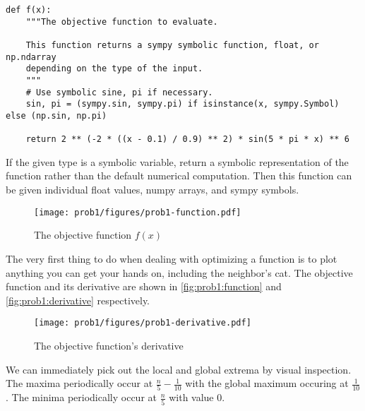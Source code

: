 \documentclass{article}
\begin{document}
\begin{verbatim}
def f(x):
    """The objective function to evaluate.

    This function returns a sympy symbolic function, float, or np.ndarray
    depending on the type of the input.
    """
    # Use symbolic sine, pi if necessary.
    sin, pi = (sympy.sin, sympy.pi) if isinstance(x, sympy.Symbol) else (np.sin, np.pi)

    return 2 ** (-2 * ((x - 0.1) / 0.9) ** 2) * sin(5 * pi * x) ** 6
\end{verbatim}

If the given type is a symbolic variable, return a symbolic representation of the function rather
than the default numerical computation. Then this function can be given individual float values,
numpy arrays, and sympy symbols.

\begin{figure}[h]
    \centering
    \texttt{[image: prob1/figures/prob1-function.pdf]}
    \caption{The objective function $f(x)$}\label{fig:prob1:function}
\end{figure}

The very first thing to do when dealing with optimizing a function is to plot anything you can get
your hands on, including the neighbor's cat. The objective function and its derivative are shown in
\autoref{fig:prob1:function} and \autoref{fig:prob1:derivative} respectively.

\begin{figure}[h]
    \centering
    \texttt{[image: prob1/figures/prob1-derivative.pdf]}
    \caption{The objective function's derivative}\label{fig:prob1:derivative}
\end{figure}

We can immediately pick out the local and global extrema by visual inspection. The maxima
periodically occur at $\frac{n}{5} - \frac{1}{10}$ with the global maximum occuring at
$\frac{1}{10}$. The minima periodically occur at $\frac{n}{5}$ with value $0$.
\end{document}
